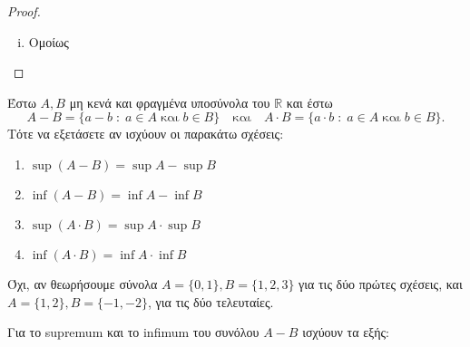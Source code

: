 \begin{proof}
\begin{enumerate}[i)]
\[\begin{aligned}
          \end{aligned} 
        \right\} \Rightarrow \sup A + \sup B - \varepsilon < a+b \leq \sup {(A+B)} 
      \] 
      Άρα 
      \[
        \sup A + \sup B < \sup {(A+B)} + \varepsilon , \quad \forall \varepsilon >0
      \] 
      Άρα από την πρόταση~\ref{lem:vare2} έχουμε ότι 
      \begin{equation}\label{eq:supsum2}
        \sup A + \sup B \leq \sup {(A+B)}
      \end{equation}
      Οπότε από τις σχέσεις~\eqref{eq:supsum1} και~\eqref{eq:supsum2}, έπεται ότι 
      $ \sup {(A+B)} = \sup A + \sup B $. 
    \item Ομοίως
  \end{enumerate}
\end{proof}

\begin{exercise}
  Έστω $ A,B $ μη κενά και φραγμένα υποσύνολα του $ \mathbb{R} $ και έστω 
  \[
    A-B= \{ a-b \; : \; a \in A \; \text{και} \; b \in B \} \quad \text{και} \quad
    A\cdot B= \{ a\cdot b \; : \; a \in A \; \text{και} \; b \in B \} . 
  \]
  Τότε να εξετάσετε αν ισχύουν οι παρακάτω σχέσεις:
  \begin{enumerate}
    \item $ \sup {(A-B)}= \sup A - \sup B $
    \item $ \inf {(A-B)}= \inf A - \inf B $
    \item $ \sup {(A\cdot B)}= \sup A \cdot  \sup B $
    \item $ \inf {(A\cdot B)}= \inf A \cdot  \inf B $
  \end{enumerate}
\end{exercise}
\begin{solution}
  Όχι, αν θεωρήσουμε σύνολα $ A = \{ 0,1 \} , B = \{ 1,2,3 \} $ για τις 
  δύο πρώτες σχέσεις, και $ A = \{ 1,2 \} , B = \{ -1,-2 \} $, για τις δύο 
  τελευταίες.
\end{solution}

\begin{rem}
  Για το supremum και το infimum του συνόλου $ A-B $ ισχύουν τα εξής:

\end{rem}

